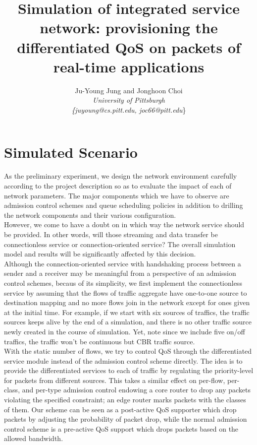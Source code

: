 \documentclass[letterpaper, 10 pt, conference]{ieeeconf}  %
\title{\LARGE \bf
Simulation of integrated service network: provisioning the differentiated QoS on packets of real-time applications
}
\author{Ju-Young Jung and Jonghoon Choi%
	\\\textit{University of Pittsburgh}%
	\\\textit{\{juyoung@cs.pitt.edu, joc66@pitt.edu}\}
}
\begin{document}
\maketitle
\thispagestyle{plain}
\pagestyle{plain}


\section{Simulated Scenario}
\label{sec:scenario}
\noindent 
As the preliminary experiment, we design the network environment carefully
according to the project description so as to evaluate the impact of each of
network parameters. The major components which we have to observe are admission
control schemes and queue scheduling policies in addition to drilling the
network components and their various configuration. \\

However, we come to have a doubt on in which way the network service should be provided. 
In other words, will those streaming and data transfer be connectionless service or
connection-oriented service? 
The overall simulation model and results will be significantly affected by this
decision.\\

Although the connection-oriented service with handshaking process between a
sender and a receiver may be meaningful from a perspective of an admission control
schemes, becaus of its simplicity, we first implement the connectionless service by assuming
that the flows of traffic aggregate have one-to-one source to destination
mapping and no more flows join in the network except for ones given at the
initial time. For example, if we start with six sources of traffics, the
traffic sources keeps alive by the end of
a simulation, and there is no other traffic source newly created in the course
of simulation. 
Yet, note since we include five on/off traffics, the traffic won't be continuous
but CBR traffic source.\\

With the static number of flows, we try to control QoS through the
differentiated service module instead of the admission control scheme directly.  
The idea is to provide the differentiated services to each of traffic by regulating the
priority-level for packets from different sources. This takes a similar effect
on per-flow, per-class, and per-type admission control endowing a core router to drop any
packets violating the specified constraint; an edge router marks packets with
the classes of them. Our scheme can be seen as a post-active QoS supporter
which drop packets by adjusting the probability of packet drop,
while the normal admission control scheme is a pre-active QoS support which 
drops packets based on the allowed bandwidth. \\
\end{document}
